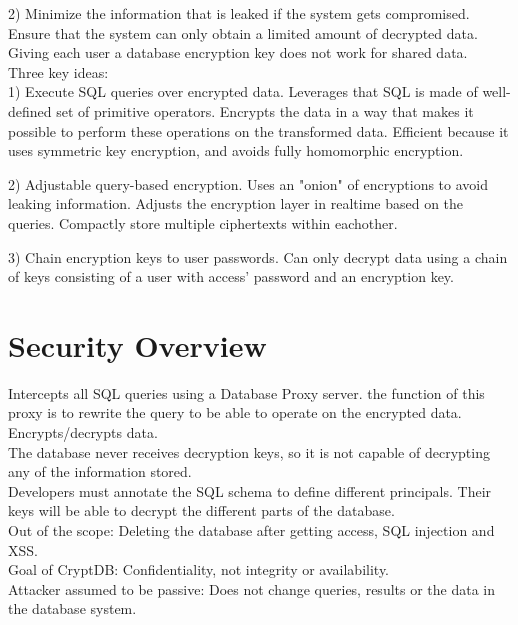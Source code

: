 \documentclass[10pt]{article}
\begin{document}
2) Minimize the information that is leaked if the system gets compromised. Ensure that the system can only obtain a limited amount of decrypted data.
Giving each user a database encryption key does not work for shared data.\\

Three key ideas:\\

1) Execute SQL queries over encrypted data. Leverages that SQL is made of well-defined set of primitive operators. Encrypts the data in a way that makes it possible to perform these operations on the transformed data. Efficient because it uses symmetric key encryption, and avoids fully homomorphic encryption.

2) Adjustable query-based encryption. Uses an "onion" of encryptions to avoid leaking information. Adjusts the encryption layer in realtime based on the queries. Compactly store multiple ciphertexts within eachother.

3) Chain encryption keys to user passwords. Can only decrypt data using a chain of keys consisting of a user with access' password and an encryption key.\\

\section{Security Overview}

Intercepts all SQL queries using a Database Proxy server. the function of this proxy is to rewrite the query to be able to operate on the encrypted data. Encrypts/decrypts data.\\

The database never receives decryption keys, so it is not capable of decrypting any of the information stored.\\

Developers must annotate the SQL schema to define different principals. Their keys will be able to decrypt the different parts of the database.\\

Out of the scope: Deleting the database after getting access, SQL injection and XSS.\\

Goal of CryptDB: Confidentiality, not integrity or availability.\\

Attacker assumed to be passive: Does not change queries, results or the data in the database system.\\
\end{document}
